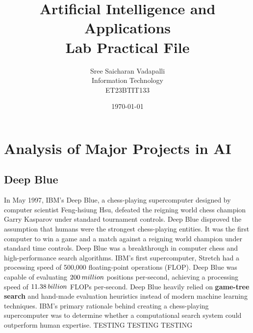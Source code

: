 \documentclass[11pt,a4paper]{report}
\begin{document}
\title{\Huge Artificial Intelligence and Applications \\ Lab Practical File}
\author{\Large Sree Saicharan Vadapalli \\ Information Technology \\ ET23BTIT133}
\date{\today}
\maketitle
\newpage

\tableofcontents
\newpage

\renewcommand{\chaptername}{Practical}

\chapter{Analysis of Major Projects in AI}

\section{Deep Blue}
In May 1997, IBM's Deep Blue, a chess-playing supercomputer designed by computer scientist Feng-hsiung Hsu, defeated the reigning
world chess champion Garry Kasparov under standard tournament controls. Deep Blue disproved the assumption that humans were the
strongest chess-playing entities. It was the first computer to win a game and a match against a reigning world champion under
standard time controls. Deep Blue was a breakthrough in computer chess and high-performance search algorithms. IBM's first supercomputer, Stretch
had a processing speed of 500,000 floating-point operations (FLOP). Deep Blue was capable of evaluating $200 \hspace{0.2em} million$ positions per-second,
achieving a processing speed of $11.38 \hspace{0.2em} billion$ FLOPs per-second.
Deep Blue heavily relied on \textbf{game-tree search} and hand-made evaluation heuristics instead of modern machine learning techniques. IBM's primary rationale
behind creating a chess-playing supercomputer was to determine whether a computational search system could outperform human expertise.
TESTING TESTING TESTING
\end{document}
